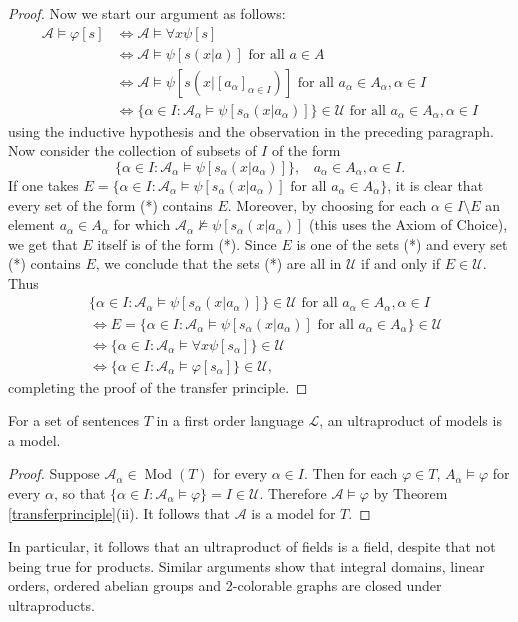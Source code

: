 \documentclass{article}
\def\A{\mathcal A}
\def\Lang{\mathcal L}
\def\U{\mathscr U}
\def\Mod{\operatorname{Mod}}
\begin{document}
\begin{proof}
Now we start our argument as follows:
\begin{align*}
\A\models\varphi[s]
&\iff\A\models\forall x\psi[s]\\
&\iff\A\models\psi[s(x|a)]\text{ for all }a\in A\\
&\iff\A\models\psi\left[s\left(x|[a_\alpha]_{\alpha\in I}\right)\right]\text{ for all }a_\alpha\in A_\alpha,\alpha\in I\\
&\iff\{\alpha\in I:\A_\alpha\models\psi\left[s_\alpha\left(x|a_\alpha\right)\right]\}\in\U\text{ for all }a_\alpha\in A_\alpha,\alpha\in I
\end{align*}
using the inductive hypothesis and the observation in the preceding paragraph.  Now consider the collection of subsets of $I$ of the form
\begin{equation}\tag{*}\{\alpha\in I:\A_\alpha\models\psi\left[s_\alpha\left(x|a_\alpha\right)\right]\},~~~~a_\alpha\in A_\alpha,\alpha\in I.\end{equation}
If one takes $E=\{\alpha\in I:\A_\alpha\models\psi\left[s_\alpha\left(x|a_\alpha\right)\right]\text{ for all }a_\alpha\in A_\alpha\}$, it is clear that every set of the form (*) contains $E$.  Moreover, by choosing for each $\alpha\in I\setminus E$ an element $a_\alpha\in A_\alpha$ for which $\A_\alpha\not\models\psi\left[s_\alpha\left(x|a_\alpha\right)\right]$ (this uses the Axiom of Choice), we get that $E$ itself is of the form (*).  Since $E$ is one of the sets (*) and every set (*) contains $E$, we conclude that the sets (*) are all in $\U$ if and only if $E\in\U$.  Thus
\begin{align*}
&\{\alpha\in I:\A_\alpha\models\psi\left[s_\alpha\left(x|a_\alpha\right)\right]\}\in\U\text{ for all }a_\alpha\in A_\alpha,\alpha\in I\\
&\iff E=\{\alpha\in I:\A_\alpha\models\psi\left[s_\alpha\left(x|a_\alpha\right)\right]\text{ for all }a_\alpha\in A_\alpha\}\in\U\\
&\iff\{\alpha\in I:\A_\alpha\models\forall x\psi\left[s_\alpha\right]\}\in\U\\
&\iff\{\alpha\in I:\A_\alpha\models\varphi\left[s_\alpha\right]\}\in\U,
\end{align*}
completing the proof of the transfer principle.
\end{proof}
\begin{corollary}\label{modelsclosed}
For a set of sentences $T$ in a first order language $\Lang$, an ultraproduct of models is a model.
\end{corollary}
\begin{proof}
Suppose $\A_\alpha\in\Mod(T)$ for every $\alpha\in I$.  Then for each $\varphi\in T$, $A_\alpha\models\varphi$ for every $\alpha$, so that $\{\alpha\in I:\A_\alpha\models\varphi\}=I\in\U$.  Therefore $\A\models\varphi$ by Theorem \ref{transferprinciple}(ii).  It follows that $\A$ is a model for $T$.
\end{proof}
\noindent In particular, it follows that an ultraproduct of fields is a field, despite that not being true for products.  Similar arguments show that integral domains, linear orders, ordered abelian groups and 2-colorable graphs are closed under ultraproducts.
\end{document}
